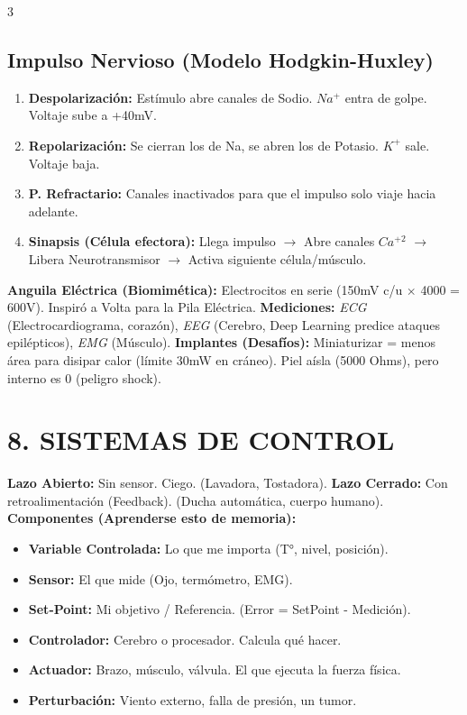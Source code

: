\documentclass[11pt,landscape,letterpaper]{extarticle}
\begin{document}
\begin{multicols*}{3}
	\subsection{Impulso Nervioso (Modelo Hodgkin-Huxley)}
	\begin{enumerate}
		\item \textbf{Despolarización:} Estímulo abre canales de Sodio. $Na^+$ entra de golpe. Voltaje sube a +40mV.
		\item \textbf{Repolarización:} Se cierran los de Na, se abren los de Potasio. $K^+$ sale. Voltaje baja.
		\item \textbf{P. Refractario:} Canales inactivados para que el impulso solo viaje hacia adelante.
		\item \textbf{Sinapsis (Célula efectora):} Llega impulso $\rightarrow$ Abre canales $Ca^{+2}$ $\rightarrow$ Libera Neurotransmisor $\rightarrow$ Activa siguiente célula/músculo.
	\end{enumerate}
	\textbf{Anguila Eléctrica (Biomimética):} Electrocitos en serie (150mV c/u $\times$ 4000 = 600V). Inspiró a Volta para la Pila Eléctrica.
	\textbf{Mediciones:} \textit{ECG} (Electrocardiograma, corazón), \textit{EEG} (Cerebro, Deep Learning predice ataques epilépticos), \textit{EMG} (Músculo).
	\textbf{Implantes (Desafíos):} Miniaturizar = menos área para disipar calor (límite 30mW en cráneo). Piel aísla (5000 Ohms), pero interno es $0$ (peligro shock).

	\section{8. SISTEMAS DE CONTROL}
	\textbf{Lazo Abierto:} Sin sensor. Ciego. (Lavadora, Tostadora).
	\textbf{Lazo Cerrado:} Con retroalimentación (Feedback). (Ducha automática, cuerpo humano).
	\textbf{Componentes (Aprenderse esto de memoria):}
	\begin{itemize}
		\item \textbf{Variable Controlada:} Lo que me importa (T°, nivel, posición).
		\item \textbf{Sensor:} El que mide (Ojo, termómetro, EMG).
		\item \textbf{Set-Point:} Mi objetivo / Referencia. (Error = SetPoint - Medición).
		\item \textbf{Controlador:} Cerebro o procesador. Calcula qué hacer.
		\item \textbf{Actuador:} Brazo, músculo, válvula. El que ejecuta la fuerza física.
		\item \textbf{Perturbación:} Viento externo, falla de presión, un tumor.
	\end{itemize}


\end{multicols*}
\end{document}
